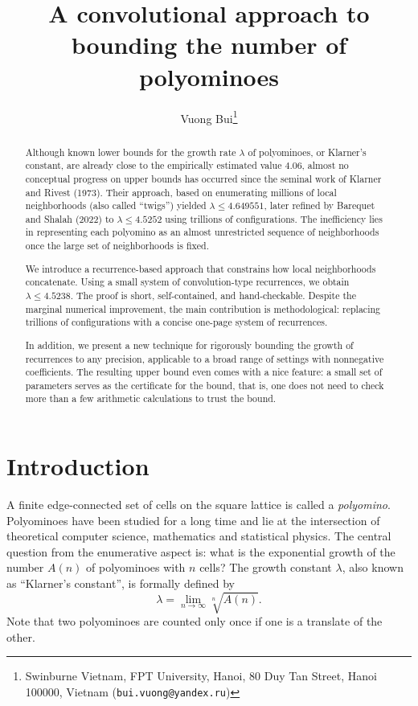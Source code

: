 \documentclass[a4paper,12pt]{article}
\title{A convolutional approach to bounding the number of polyominoes}
\author{Vuong Bui\thanks{
Swinburne Vietnam, FPT University, Hanoi, 80 Duy Tan Street, Hanoi 100000, Vietnam (\texttt{bui.vuong@yandex.ru})}}
\date{}
\begin{document}
\allowdisplaybreaks

\maketitle

\begin{abstract}
Although known lower bounds for the growth rate $\lambda$ of polyominoes, or Klarner's constant, are already close to the empirically estimated value $4.06$, almost no conceptual progress on upper bounds has occurred since the seminal work of Klarner and Rivest (1973). Their approach, based on enumerating millions of local neighborhoods (also called ``twigs'') yielded $\lambda \le 4.649551$, later refined by Barequet and Shalah (2022) to $\lambda \le 4.5252$ using trillions of configurations. The inefficiency lies in representing each polyomino as an almost unrestricted sequence of neighborhoods once the large set of neighborhoods is fixed.

We introduce a recurrence-based approach that constrains how local neighborhoods concatenate. Using a small system of convolution-type recurrences, we obtain $\lambda \le 4.5238$. The proof is short, self-contained, and hand-checkable. Despite the marginal numerical improvement, the main contribution is methodological: replacing trillions of configurations with a concise one-page system of recurrences. 

In addition, we present a new technique for rigorously bounding the growth of recurrences to any precision, applicable to a broad range of settings with nonnegative coefficients. The resulting upper bound even comes with a nice feature: a small set of parameters serves as the certificate for the bound, that is, one does not need to check more than a few arithmetic calculations to trust the bound.
\end{abstract}

\section{Introduction}
A finite edge-connected set of cells on the square lattice is called a \emph{polyomino}. Polyominoes have been studied for a long time and lie at the intersection of theoretical computer science, mathematics and statistical physics. The central question from the enumerative aspect is: what is the exponential growth of the number $A(n)$ of polyominoes with $n$ cells? The growth constant $\lambda$, also known as ``Klarner's constant'', is formally defined by
\[
    \lambda = \lim_{n\to\infty} \sqrt[n]{A(n)}.
\]
Note that two polyominoes are counted only once if one is a translate of the other.
\end{document}
